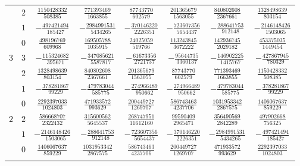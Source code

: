\begin{table}
\begin{center}
\begin{tabular}{cccccccc}
           &  $2$  &  $ \frac{1150428332}{  508385}$  &  $ \frac{ 771393469}{ 1663855}$  &  $ \frac{  87743770}{  602579}$  &  $ \frac{ 201365679}{ 1563055}$  &  $ \frac{ 840802608}{ 2367661}$  &  $ \frac{1328498639}{  803154}$  \\ \addlinespace
           &  $1$  &  $-\frac{ 497421494}{  185427}$  &  $-\frac{2984991531}{ 5434265}$  &  $-\frac{ 370146220}{ 2226351}$  &  $-\frac{ 723607356}{ 5654437}$  &  $-\frac{ 288641753}{  912148}$  &  $-\frac{2146148426}{ 1503065}$  \\ \addlinespace
           &  $0$  &  $ \frac{ 498196769}{  609968}$  &  $ \frac{ 169505788}{ 1035915}$  &  $ \frac{  24025059}{  519766}$  &  $ \frac{ 113243845}{ 3672222}$  &  $ \frac{ 142936745}{ 2029182}$  &  $ \frac{ 453375035}{ 1449454}$  \\ \addlinespace
      $3$  &  $3$  &  $-\frac{ 115324682}{  395671}$  &  $-\frac{ 347085621}{ 5587817}$  &  $-\frac{  61673356}{ 2721737}$  &  $-\frac{  95644735}{ 3360137}$  &  $-\frac{ 146902225}{ 1415767}$  &  $-\frac{ 427867945}{  780329}$  \\ \addlinespace
           &  $2$  &  $ \frac{1328498639}{  803154}$  &  $ \frac{ 840802608}{ 2367661}$  &  $ \frac{ 201365679}{ 1563055}$  &  $ \frac{  87743770}{  602579}$  &  $ \frac{ 771393469}{ 1663855}$  &  $ \frac{1150428332}{  508385}$  \\ \addlinespace
           &  $1$  &  $-\frac{ 378281867}{   99229}$  &  $-\frac{ 479783044}{  585775}$  &  $-\frac{ 274966489}{  950662}$  &  $-\frac{ 274966489}{  950662}$  &  $-\frac{ 479783044}{  585775}$  &  $-\frac{ 378281867}{   99229}$  \\ \addlinespace
           &  $0$  &  $ \frac{2292397033}{ 1024803}$  &  $ \frac{ 471933572}{  993629}$  &  $ \frac{ 200449727}{ 1269707}$  &  $ \frac{ 586743463}{ 4237706}$  &  $ \frac{1031953342}{ 2867575}$  &  $ \frac{1406067637}{  859229}$  \\ \addlinespace
      $2$  &  $2$  &  $ \frac{ 586668707}{ 2322432}$  &  $ \frac{ 315600562}{ 5645537}$  &  $ \frac{ 268747951}{11612160}$  &  $ \frac{  99590409}{ 2965471}$  &  $ \frac{ 356490569}{ 2842289}$  &  $ \frac{ 497902668}{  756325}$  \\ \addlinespace
           &  $1$  &  $-\frac{2146148426}{ 1503065}$  &  $-\frac{ 288641753}{  912148}$  &  $-\frac{ 723607356}{ 5654437}$  &  $-\frac{ 370146220}{ 2226351}$  &  $-\frac{2984991531}{ 5434265}$  &  $-\frac{ 497421494}{  185427}$  \\ \addlinespace
           &  $0$  &  $ \frac{1406067637}{  859229}$  &  $ \frac{1031953342}{ 2867575}$  &  $ \frac{ 586743463}{ 4237706}$  &  $ \frac{ 200449727}{ 1269707}$  &  $ \frac{ 471933572}{  993629}$  &  $ \frac{2292397033}{ 1024803}$  \\ \addlinespace

\end{tabular}
\end{center}
\end{table}
